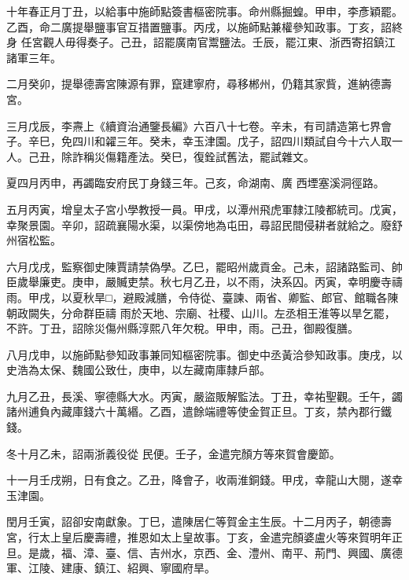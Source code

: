 \begin{pinyinscope}
 十年春正月丁丑，以給事中施師點簽書樞密院事。命州縣掘蝗。甲申，李彥穎罷。乙酉，命二廣提舉鹽事官互措置鹽事。丙戌，以施師點兼權參知政事。丁亥，詔終身
 任宮觀人毋得奏子。己丑，詔罷廣南官鬻鹽法。壬辰，罷江東、浙西寄招鎮江諸軍三年。



 二月癸卯，提舉德壽宮陳源有罪，竄建寧府，尋移郴州，仍籍其家貲，進納德壽宮。



 三月戊辰，李燾上《續資治通鑒長編》六百八十七卷。辛未，有司請造第七界會子。辛巳，免四川和糴三年。癸未，幸玉津園。戊子，詔四川類試自今十六人取一人。己丑，除詐稱災傷籍產法。癸巳，復銓試舊法，罷試雜文。



 夏四月丙申，再蠲臨安府民丁身錢三年。己亥，命湖南、廣
 西堙塞溪洞徑路。



 五月丙寅，增皇太子宮小學教授一員。甲戌，以潭州飛虎軍隸江陵都統司。戊寅，幸聚景園。辛卯，詔疏襄陽水渠，以渠傍地為屯田，尋詔民間侵耕者就給之。廢舒州宿松監。



 六月戊戌，監察御史陳賈請禁偽學。乙巳，罷昭州歲貢金。己未，詔諸路監司、帥臣歲舉廉吏。庚申，嚴贓吏禁。秋七月乙丑，以不雨，決系囚。丙寅，幸明慶寺禱雨。甲戌，以夏秋旱□，避殿減膳，令侍從、臺諫、兩省、卿監、郎官、館職各陳朝政闕失，分命群臣禱
 雨於天地、宗廟、社稷、山川。左丞相王淮等以旱乞罷，不許。丁丑，詔除災傷州縣淳熙八年欠稅。甲申，雨。己丑，御殿復膳。



 八月戊申，以施師點參知政事兼同知樞密院事。御史中丞黃洽參知政事。庚戌，以史浩為太保、魏國公致仕，庚申，以左藏南庫隸戶部。



 九月乙丑，長溪、寧德縣大水。丙寅，嚴盜販解監法。丁丑，幸祐聖觀。壬午，蠲諸州逋負內藏庫錢六十萬緡。乙酉，遣餘端禮等使金賀正旦。丁亥，禁內郡行鐵錢。



 冬十月乙未，詔兩浙義役從
 民便。壬子，金遣完顏方等來賀會慶節。



 十一月壬戌朔，日有食之。乙丑，降會子，收兩淮銅錢。甲戌，幸龍山大閱，遂幸玉津園。



 閏月壬寅，詔卻安南獻象。丁巳，遣陳居仁等賀金主生辰。十二月丙子，朝德壽宮，行太上皇后慶壽禮，推恩如太上皇故事。丁亥，金遣完顏婆盧火等來賀明年正旦。是歲，福、漳、臺、信、吉州水，京西、金、澧州、南平、荊門、興國、廣德軍、江陵、建康、鎮江、紹興、寧國府旱。




\end{pinyinscope}
